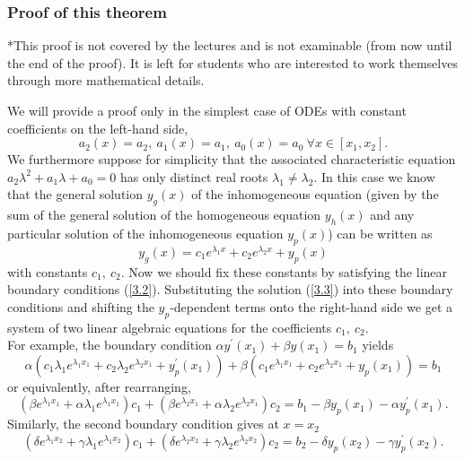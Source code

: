 \documentclass[11pt,a4paper,twoside]{article}
\begin{document}
	\subsubsection{Proof of this theorem}
	*This proof is not covered by the lectures and is not examinable (from now until the end of the proof). It is left for students who are interested to work themselves through more mathematical details.\par
	We will provide a proof only in the simplest case of ODEs with constant coefficients on the left-hand side,
	$$
	a_2(x) = a_2 ,\ a_1(x) = a_1 ,\ a_0(x) = a_0\ \forall x \in [x_1, x_2].
	$$
	We furthermore suppose for simplicity that the associated characteristic equation $a_2\lambda^2 + a_1\lambda + a_0 = 0$ has only distinct real roots $\lambda_1 \neq \lambda_2$. In this case we know that the general solution $y_g(x)$ of the inhomogeneous equation (given by the sum of the general solution of the homogeneous equation $y_h(x)$ and any particular solution of the inhomogeneous equation $y_p(x)$) can be written as
	\begin{equation}\label{3.3}
		y_g(x) = c_1e^{\lambda_1 x} + c_2e^{\lambda_2 x} + y_p(x)
	\end{equation}
	with constants $c_1,\ c_2$. Now we should fix these constants by satisfying the linear boundary conditions (\ref{3.2}). Substituting the solution (\ref{3.3}) into these boundary conditions and shifting the $y_p$-dependent terms onto the right-hand side we get a system of two linear algebraic equations for the coefficients $c_1,\ c_2$.\\
	For example, the boundary condition $\alpha y^\prime (x_1) + \beta y(x_1) = b_1$ yields
	$$
	\alpha (c_1\lambda_1e^{\lambda_1x_1} + c_2\lambda_2e^{\lambda_2x_1} + y_p^\prime (x_1)) + \beta (c_1e^{\lambda_1x_1} + c_2e^{\lambda_2x_1} + y_p(x_1)) = b_1
	$$
	or equivalently, after rearranging,
	\begin{equation}\label{3.4}
		(\beta e^{\lambda_1x_1} + \alpha\lambda_1 e^{\lambda_1x_1})c_1 + (\beta e^{\lambda_2x_1} + \alpha \lambda_2e^{\lambda_2x_1})c_2 = b_1 - \beta y_p(x_1) - \alpha y^\prime_p(x_1).
	\end{equation}
	Similarly, the second boundary condition gives at $x = x_2$
	\begin{equation}\label{3.5}
		(\delta e^{\lambda_1x_2} + \gamma\lambda_1 e^{\lambda_1x_2})c_1 + (\delta e^{\lambda_2x_2} + \gamma \lambda_2e^{\lambda_2x_2})c_2 = b_2 - \delta y_p(x_2) - \gamma y^\prime_p(x_2).
	\end{equation}
\end{document}
